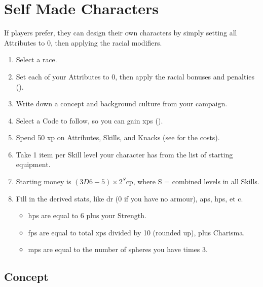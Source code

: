 \section{Self Made Characters}

\begin{multicols}{2}

\label{playerchosen}

\noindent
If players prefer, they can design their own characters by simply setting all Attributes to 0, then applying the racial modifiers.

\begin{enumerate}
  \item\label{sumCCrace}
  Select a race.
  \item\label{sumCCatt}
  Set each of your Attributes to 0, then apply the racial bonuses and penalties ().
  \item\label{sumCCconcept}
  Write down a concept and background culture from your campaign.
  \item\label{sumCCcode}
  Select a Code to follow, so you can gain \glspl{xp} ().
  \item\label{sumCCxp}
  Spend 50 \gls{xp} on Attributes, Skills, and Knacks (see  for the costs).
  \item\label{sumCCequip}
  Take 1 item per Skill level your character has from the list of starting equipment.
  \item\label{sumCCcoin}
  Starting money is $(3D6-5)\times 2^S$\gls{cp}, where S = combined levels in all Skills.
  \item\label{sumCCder}
  Fill in the derived stats, like \gls{dr} (0 if you have no armour), \glspl{ap}, \glspl{hp}, et c.
  \begin{itemize}
    \item
    \glspl{hp} are equal to 6 plus your Strength.
    \item
    \glspl{fp} are equal to total \glspl{xp} divided by 10 (rounded up), plus Charisma.
    \item
    \glspl{mp} are equal to the number of spheres you have times 3.
  \end{itemize}
\end{enumerate}

\subsection{Concept}


\end{multicols}
